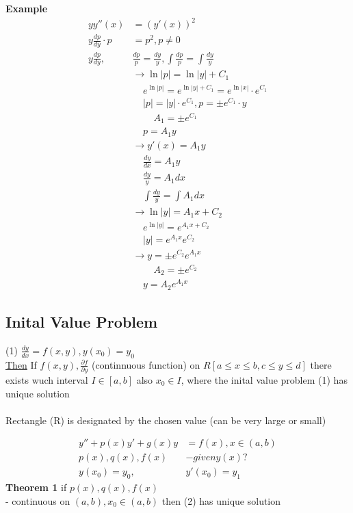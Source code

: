 \documentclass[10pt, letterpaper]{article}
\begin{document}
\textbf{Example}
\begin{align*}
yy''(x) &= (y'(x))^2\\
y\frac{dp}{dy} \cdot p &= p^2, p \neq 0\\
y\frac{dp}{dy},& \frac{dp}{p} = \frac{dy}{y}, \int \limits \frac{dp}{p} = \int \limits \frac{dy}{y}\\
&\rightarrow \ln|p| = \ln|y| + C_1\\
&~~~~~ e^{\ln|p|} = e^{\ln|y| + C_1} = e^{\ln|x|} \cdot e^{C_1}\\
&~~~~~ |p| = |y| \cdot e^{C_1}, p = \pm e^{C_1} \cdot y\\
&~~~~~~~~~~ A_1 = \pm e^{C_1}\\
&~~~~~ p=A_1 y\\
&\rightarrow y'(x) = A_1 y\\
&~~~~~ \frac{dy}{dx} = A_1 y\\
&~~~~~ \frac{dy}{y} = A_1 dx\\
&~~~~~ \int \limits \frac{dy}{y} = \int \limits A_1 dx\\
&\rightarrow \ln|y| = A_1 x + C_2\\
&~~~~~ e^{\ln|y|} = e^{A_1 x + C_2}\\
&~~~~~ |y| = e^{A_1 x} e^{C_2}\\
&\rightarrow y = \pm e^{C_2}e^{A_1 x}\\
&~~~~~~~~~~ A_2 = \pm e^{C_2}\\
&~~~~~ y=A_2 e^{A_1 x}
\end{align*}

\subsection{Inital Value Problem}
(1) $\frac{dy}{dx} = f(x,y), y(x_0)=y_0$\\
\underline{Then} If $f(x,y), \frac{\partial f}{\partial y}$ (continnuous function) on $R[a \leq x \leq b, c \leq y \leq d]$ there exists wuch interval $I \in [a,b]$ also $x_0 \in I$, where the inital value problem (1) has unique solution\\
\\
Rectangle (R) is designated by the chosen value (can be very large or small)

\begin{align*}
y''+p(x)y'+g(x)y &= f(x), x \in (a,b)\\
p(x), q(x), f(x)& - given y(x)?\\
y(x_0) = y_0,& y'(x_0)=y_1
\end{align*}
\textbf{Theorem 1} if $p(x), q(x), f(x)$\\
- continuous on $(a, b), x_0 \in (a,b)$ then (2) has unique solution\\
\end{document}
